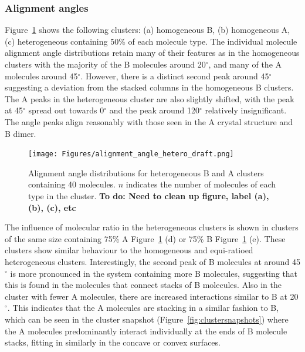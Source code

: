 \subsubsection{Alignment angles}
Figure~\ref{fig:alignmentangles_hetero} shows the following clusters: (a) homogeneous B, (b) homogeneous A, (c) heterogeneous containing 50\% of each molecule type. The individual molecule alignment angle distributions retain many of their features as in the homogeneous clusters with the majority of the B molecules around 20$^{\circ}$, and many of the A molecules around 45$^{\circ}$.  However, there is a distinct second peak around 45$^{\circ}$ suggesting a deviation from the stacked columns in the homogeneous B clusters. The A peaks in the heterogeneous cluster are also slightly shifted, with the peak at 45$^{\circ}$ spread out towards 0$^{\circ}$ and the peak around 120$^{\circ}$ relatively insignificant.
The angle peaks align reasonably with those seen in the A crystal structure and B dimer. %
%
\begin{figure}[!tbh]
\centering
\texttt{[image: Figures/alignment\_angle\_hetero\_draft.png]}
\caption{Alignment angle distributions for heterogeneous B and A clusters containing 40 molecules. $n$ indicates the number of molecules of each type in the cluster. \textbf{To do: Need to clean up figure, label (a), (b), (c), etc}}
\label{fig:alignmentangles_hetero}
\end{figure}
%

The influence of molecular ratio in the heterogeneous clusters is shown in clusters of the same size containing 75\% A Figure~\ref{fig:alignmentangles_hetero} (d) or 75\% B Figure~\ref{fig:alignmentangles_hetero} (e). These clusters show similar behaviour to the homogeneous and equi-ratioed heterogeneous clusters.  Interestingly, the second peak of B molecules at around 45$^{\circ}$ is more pronounced in the system containing more B molecules, suggesting that this is found in the molecules that connect stacks of B molecules.  Also in the cluster with fewer A molecules, there are increased interactions similar to B at 20$^{\circ}$. This indicates that the A molecules are stacking in a similar fashion to B, which can be seen in the cluster snapshot (Figure~\ref{fig:clustersnapshots}) where the A molecules predominantly interact individually at the ends of B molecule stacks, fitting in similarly in the concave or convex surfaces.

